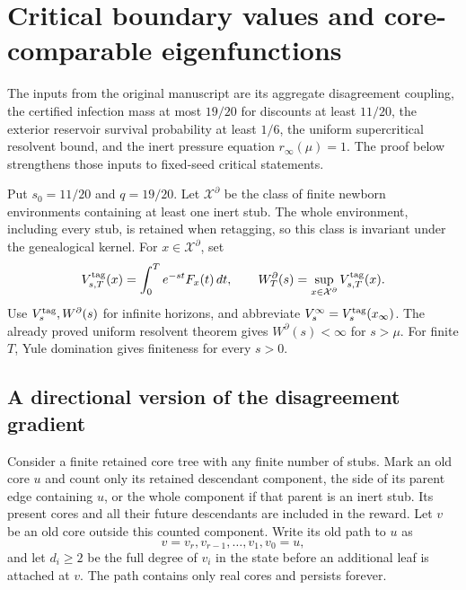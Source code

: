
\section{Critical boundary values and core-comparable eigenfunctions}
\label{cr:section}

The inputs from the original manuscript\cite{Long} are its aggregate
disagreement coupling, the certified infection mass at most $19/20$ for
discounts at least $11/20$, the exterior reservoir survival probability
at least $1/6$, the uniform supercritical resolvent bound, and the inert
pressure equation $r_\infty(\mu)=1$. The proof below strengthens those
inputs to fixed-seed critical statements.

Put $s_0=11/20$ and $q=19/20$.  Let $\mathcal X^\partial$ be the
class of finite newborn environments containing at least one inert
stub.  The whole environment, including every stub, is retained when
retagging, so this class is invariant under the genealogical kernel.
For $x\in\mathcal X^\partial$, set
\[
 V_{s,T}^{\rm tag}(x)=\int_0^T e^{-st}F_x(t)\,dt,
 \qquad W_T^\partial(s)=\sup_{x\in\mathcal X^\partial}
 V_{s,T}^{\rm tag}(x).
\]
Use $V_s^{\rm tag},W^\partial(s)$ for infinite horizons, and abbreviate
$V_s^\infty=V_s^{\rm tag}(x_\infty)$.  The already proved uniform
resolvent theorem gives $W^\partial(s)<\infty$ for $s>\mu$.
For finite $T$, Yule domination gives finiteness for every $s>0$.

\subsection{A directional version of the disagreement gradient}

Consider a finite retained core tree with any finite number of stubs.
Mark an old core $u$ and count only its retained descendant component,
the side of its parent edge containing $u$, or the whole component if
that parent is an inert stub.  Its present cores and all their future
descendants are included in the reward.  Let $v$ be an old core
outside this counted component.  Write its old path to $u$ as
\[
 v=v_r,v_{r-1},\ldots,v_1,v_0=u,
\]
and let $d_i\ge2$ be the full degree of $v_i$ in the state before an
additional leaf is attached at $v$.  The path contains only real
cores and persists forever.

